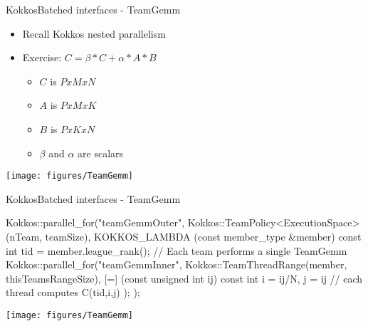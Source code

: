 \begin{frame}[fragile]{KokkosBatched interfaces - TeamGemm}
  \begin{itemize}
    \item Recall Kokkos nested parallelism
    \item Exercise: $C = \beta * C + \alpha * A * B$
    \begin{itemize}
      \item $C$ is $P x M x N$
      \item $A$ is $P x M x K$
      \item $B$ is $P x K x N$
      \item $\beta$ and $\alpha$ are scalars
    \end{itemize}
  \end{itemize}
  \vspace{10pt}
  \begin{center}
    \texttt{[image: figures/TeamGemm]}
  \end{center}
\end{frame}

\begin{frame}[fragile]{KokkosBatched interfaces - TeamGemm}
  \begin{code}[keywords={parallel_for,auto,const,int}]
    Kokkos::parallel_for("teamGemmOuter", 
      Kokkos::TeamPolicy<ExecutionSpace>(nTeam, teamSize),
      KOKKOS_LAMBDA (const member_type &member) {
        const int tid = member.league_rank();
        // Each team performs a single TeamGemm
        Kokkos::parallel_for("teamGemmInner",
          Kokkos::TeamThreadRange(member, thisTeamsRangeSize),
          [=] (const unsigned int ij) {
            const int i = ij/N, j = ij%
            // each thread computes C(tid,i,j)
        });
    });
  \end{code}
  \vspace{10pt}
  \begin{center}
    \texttt{[image: figures/TeamGemm]}
  \end{center}
\end{frame}

